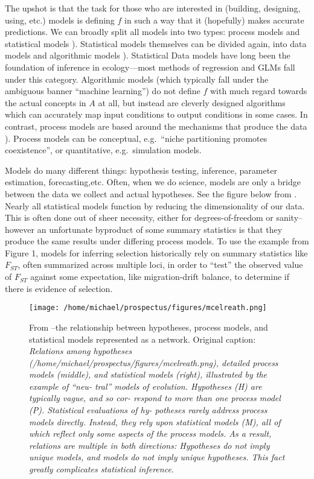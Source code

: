 \documentclass[]{article}
\begin{document}
The upshot is that the task for those who are interested in (building,
designing, using, etc.) models is defining \(f\) in such a way that it
(hopefully) makes accurate predictions. We can broadly split all models
into two types: process models and statistical models
\citep{mcelreath_statistical_2020}). Statistical models themselves can be divided
again, into data models and algorithmic models \citep{breiman_statistical_2001}).
Statistical Data models have long been the foundation of inference in
ecology---most methods of regression and GLMs fall under this category.
Algorithmic models (which typically fall under the ambiguous banner
``machine learning'') do not define \(f\) with much regard towards the
actual concepts in \(A\) at all, but instead are cleverly designed
algorithms which can accurately map input conditions to output
conditions in some cases. In contrast, process models are based around
the mechanisms that produce the data \citep{mcelreath_statistical_2020}). Process
models can be conceptual, e.g.~``niche partitioning promotes
coexistence'', or quantitative, e.g.~simulation models.

Models do many different things: hypothesis testing, inference,
parameter estimation, forecasting,etc. Often, when we do science, models
are only a bridge between the data we collect and actual hypotheses. See
the figure below from \citep{mcelreath_statistical_2020}. Nearly all statistical
models function by reducing the dimensionality of our data. This is
often done out of sheer necessity, either for degrees-of-freedom or
sanity--however an unfortunate byproduct of some summary statistics is
that they produce the same results under differing process models. To
use the example from Figure 1, models for inferring selection
historically rely on summary statistics like \(F_{ST}\), often
summarized across multiple loci, in order to ``test'' the observed value
of \(F_{ST}\) against some expectation, like migration-drift balance, to
determine if there is evidence of selection.

\begin{figure}[h]
\centering
\texttt{[image: /home/michael/prospectus/figures/mcelreath.png]}
    \caption{From \citet{mcelreath_statistical_2020}--the relationship between hypotheses,
process models, and statistical models represented as a network.
Original caption: \emph{Relations among hypotheses
(/home/michael/prospectus/figures/mcelreath.png), detailed process
models (middle), and statistical models (right), illustrated by the
example of ``neu- tral'' models of evolution. Hypotheses (H) are
typically vague, and so cor- respond to more than one process model (P).
Statistical evaluations of hy- potheses rarely address process models
directly. Instead, they rely upon statistical models (M), all of which
reflect only some aspects of the process models. As a result, relations
are multiple in both directions: Hypotheses do not imply unique models,
and models do not imply unique hypotheses. This fact greatly complicates
statistical inference.}}
\end{figure}
\end{document}
